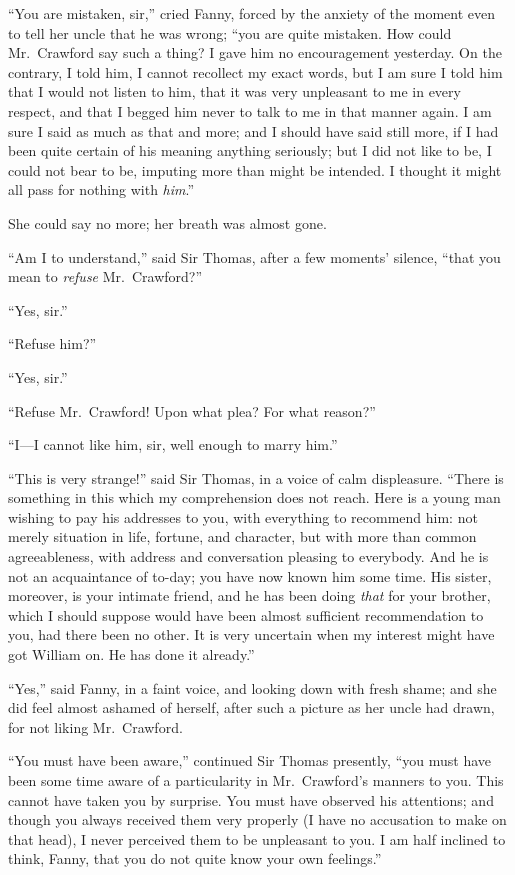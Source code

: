 \documentclass{article}
\begin{document}
``You are mistaken, sir,'' cried Fanny, forced by the anxiety
of the moment even to tell her uncle that he was wrong;
``you are quite mistaken.  How could Mr.\ Crawford say
such a thing?  I gave him no encouragement yesterday.
On the contrary, I told him, I cannot recollect my exact words,
but I am sure I told him that I would not listen to him,
that it was very unpleasant to me in every respect, and that
I begged him never to talk to me in that manner again.
I am sure I said as much as that and more; and I should
have said still more, if I had been quite certain of his
meaning anything seriously; but I did not like to be,
I could not bear to be, imputing more than might be intended.
I thought it might all pass for nothing with \emph{him}.''

She could say no more; her breath was almost gone.

``Am I to understand,'' said Sir Thomas, after a few moments'
silence, ``that you mean to \emph{refuse} Mr.\ Crawford?''

``Yes, sir.''

``Refuse him?''

``Yes, sir.''

``Refuse Mr.\ Crawford!  Upon what plea?  For what reason?''

``I---I cannot like him, sir, well enough to marry him.''

``This is very strange!'' said Sir Thomas, in a voice of
calm displeasure.  ``There is something in this which my
comprehension does not reach.  Here is a young man wishing
to pay his addresses to you, with everything to recommend him:
not merely situation in life, fortune, and character,
but with more than common agreeableness, with address
and conversation pleasing to everybody.  And he is not an
acquaintance of to-day; you have now known him some time.
His sister, moreover, is your intimate friend, and he has
been doing \emph{that} for your brother, which I should suppose
would have been almost sufficient recommendation to you,
had there been no other.  It is very uncertain when my
interest might have got William on.  He has done it already.''

``Yes,'' said Fanny, in a faint voice, and looking down
with fresh shame; and she did feel almost ashamed
of herself, after such a picture as her uncle had drawn,
for not liking Mr.\ Crawford.

``You must have been aware,'' continued Sir Thomas presently,
``you must have been some time aware of a particularity
in Mr.\ Crawford's manners to you.  This cannot have taken
you by surprise.  You must have observed his attentions;
and though you always received them very properly (I have
no accusation to make on that head), I never perceived them
to be unpleasant to you.  I am half inclined to think,
Fanny, that you do not quite know your own feelings.''
\end{document}

